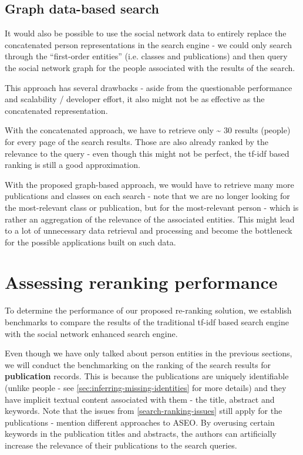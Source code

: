 \subsection{Graph data-based search} \label{graph-based-search}

It would also be possible to use the social network data to entirely replace the concatenated person representations in the search engine - we could 
only search through the ``first-order entities'' (i.e. classes and publications) and then query the social network graph for the people associated 
with the results of the search. 

This approach has several drawbacks - aside from the questionable performance and scalability / developer effort, it also might not be as effective as the concatenated representation.

With the concatenated approach, we have to retrieve only \textasciitilde{} 30 results (people) for every page of the search results. 
Those are also already ranked by the relevance to the query - even though this might not be perfect, the tf-idf based ranking is still a good approximation.

With the proposed graph-based approach, we would have to retrieve many more publications and classes on each search - note that we are no longer 
looking for the most-relevant class or publication, but for the most-relevant person - which is rather an aggregation of the relevance of the associated entities.
This might lead to a lot of unnecessary data retrieval and processing and become the bottleneck for the possible applications built on such data.


\section{Assessing reranking performance}

To determine the performance of our proposed re-ranking solution, we establish benchmarks to compare the results of the traditional tf-idf based search engine with the social network enhanced search engine.

Even though we have only talked about person entities in the previous sections, we will conduct the benchmarking on the ranking of the search results for \textbf{publication} records.
This is because the publications are uniquely identifiable (unlike people - see \ref{sec:inferring-missing-identities} for more details) 
and they have implicit textual content associated with them - the title, abstract and keywords.
Note that the issues from \ref{search-ranking-issues} still apply for the publications - \cite{aseo} mention different approaches to \ac{ASEO}.
By overusing certain keywords in the publication titles and abstracts, the authors can artificially increase the relevance of their publications to the search queries.

